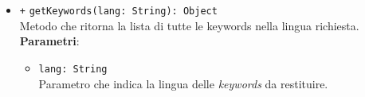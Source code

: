 \begin{itemize}
\begin{itemize}
\begin{itemize}
		\end{itemize}
		\item \texttt{+} \texttt{getKeywords(lang: String): Object} \\Metodo che ritorna la lista di tutte le keywords nella lingua richiesta.\\
		\textbf{Parametri}:
		\begin{itemize}
			\item \texttt{lang: String} \\ Parametro che indica la lingua delle \textit{keywords} da restituire.
		\end{itemize}
	\end{itemize}
\end{itemize}